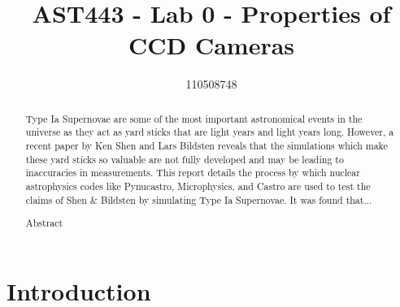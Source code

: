 \documentclass[preprint]{aastex62}
\begin{document}
\title{AST443 - Lab 0 - Properties of CCD Cameras}
\author{110508748}

  

\begin{abstract}
  
  Type Ia Supernovae are some of the most important astronomical events in the universe as they act as yard sticks that are light years and light years long. However, a recent paper by Ken Shen and Lars Bildsten reveals that the simulations which make these yard sticks so valuable are not fully developed and may be leading to inaccuracies in measurements. This report details the process by which nuclear astrophysics codes like Pynucastro, Microphysics, and Castro are used to test the claims of Shen \& Bildsten by simulating Type Ia Supernovae. It was found that... %
  

  Abstract

\end{abstract}

\pagebreak

\section{Introduction}

\end{document}
